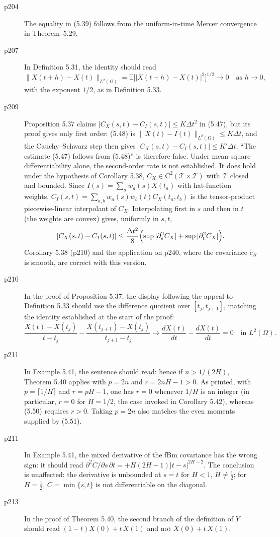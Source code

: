 \documentclass[final]{article}
\theoremstyle{definition}
\begin{document}
\begin{enumerate}
\begin{description}
   \item[p204] The equality in (5.39) follows from the uniform-in-time Mercer convergence in
Theorem~5.29.
   \item[p207] In Definition 5.31, the identity should read
\[
\|X(t+h)-X(t)\|_{L^{2}(\Omega)}
=\mathbb{E}\bigl[|X(t+h)-X(t)|^{2}\bigr]^{1/2}\to0
\quad\text{as }h\to0,
\]
with the exponent $1/2$, as in Definition 5.33.
   \item[p209] Proposition 5.37 claims $|C_X(s,t)-C_I(s,t)|\le K\Delta t^2$ in
(5.47), but its proof gives only first order: (5.48) is
$\|X(t)-I(t)\|_{L^2(\Omega)}\le K\Delta t$, and the Cauchy--Schwarz step then
gives $|C_X(s,t)-C_I(s,t)|\le K'\Delta t$. ``The estimate (5.47) follows from
(5.48)'' is therefore false. Under mean-square differentiability alone, the
second-order rate is not established. It does hold under the hypothesis of
Corollary 5.38, $C_X\in\mathrm{C}^2(\mathcal T\times\mathcal T)$ with
$\mathcal T$ closed and bounded. Since $I(s)=\sum_a w_a(s)X(t_a)$ with
hat-function weights, $C_I(s,t)=\sum_{a,b}w_a(s)w_b(t)C_X(t_a,t_b)$ is the
tensor-product piecewise-linear interpolant of $C_X$. Interpolating first in $s$
and then in $t$ (the weights are convex) gives, uniformly in $s,t$,
\[
|C_X(s,t)-C_I(s,t)|\le\frac{\Delta t^2}{8}\Bigl(\sup|\partial_s^2C_X|+\sup|\partial_t^2C_X|\Bigr).
\]
Corollary 5.38 (p210) and the application on p240, where the covariance
$\tilde c_R$ is smooth, are correct with this version.
   \item[p210] In the proof of Proposition 5.37, the display
following the appeal to Definition 5.33 should use the difference quotient over
$[t_{j},t_{j+1}]$, matching the identity established at the start of the proof:
\[
\frac{X(t)-X(t_{j})}{t-t_{j}}-\frac{X(t_{j+1})-X(t_{j})}{t_{j+1}-t_{j}}
\to\frac{dX(t)}{dt}-\frac{dX(t)}{dt}=0
\quad\text{in }L^{2}(\Omega).
\]

   \item[p211] In Example 5.41, the sentence should read: hence if
$n>1/(2H)$, Theorem 5.40 applies with $p=2n$ and $r=2nH-1>0$. As printed, with
$p=\lceil1/H\rceil$ and $r=pH-1$, one has $r=0$ whenever $1/H$ is an integer (in particular, $r=0$ for $H=1/2$, the case invoked in Corollary 5.42), whereas
(5.50) requires $r>0$. Taking $p=2n$ also matches the even moments supplied
by (5.51).
   \item[p211] In Example 5.41, the mixed derivative of the fBm covariance has
the wrong sign: it should read
$\partial^2C/\partial s\,\partial t=+H(2H-1)|t-s|^{2H-2}$.  The conclusion is
unaffected: the derivative is unbounded at $s=t$ for $H<1$, $H\ne\frac12$; for
$H=\frac12$, $C=\min\{s,t\}$ is not differentiable on the diagonal.
   \item[p213] In the proof of Theorem 5.40, the second branch of
the definition of $Y$ should read $(1-t)X(0)+t\,X(1)$ and not $X(0)+t\,X(1)$.


\end{description}
\end{enumerate}
\end{document}
